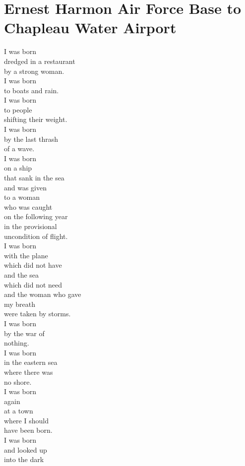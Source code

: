 \documentclass[smalldemyvopaper,11pt,twoside,onecolumn,openright,extrafontsizes]{memoir}
\begin{document}
\chapter{Ernest Harmon Air Force Base to Chapleau Water Airport}
I was born
\\dredged in a restaurant
\\by a strong woman.
\\I was born
\\to boats and rain.
\\I was born
\\to people
\\shifting their weight.
\\I was born
\\by the last thrash
\\of a wave.
\\I was born
\\on a ship
\\that sank in the sea
\\and was given
\\to a woman
\\who was caught
\\on the following year
\\in the provisional
\\uncondition of flight.
\\I was born
\\with the plane
\\which did not have
\\and the sea
\\which did not need
\\and the woman who gave
\\my breath
\\were taken by storms.
\\I was born
\\by the war of
\\nothing.
\\I was born
\\in the eastern sea
\\where there was
\\no shore.
\\I was born
\\again
\\at a town
\\where I should
\\have been born.
\\I was born
\\and looked up
\\into the dark
\end{document}
